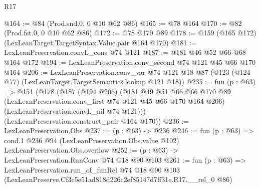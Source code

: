 \begin{lexlean}{R17}
\begin{coremodule}
@164 := @84 (Prod.snd.{0, 0} @10 @62 @86)
@165 := @78 @164
@170 := @82 (Prod.fst.{0, 0} @10 @62 @86)
@172 := @78 @170 @89
@178 := @159 (@165 @172) (LexLeanTarget.TargetSyntax.Value.pair @164 @170)
@181 := LexLeanPreservation.convL_cons @74 @121
@187 := @181 @46 @52 @66 @68 @164 @172
@194 := LexLeanPreservation.conv_second @74 @121 @45 @66 @170 @164
@206 := LexLeanPreservation.conv_var
    @74
    @121
    @18
    @87
    (@123 (@124 @77) (LexLeanTarget.TargetSemantics.lookup @121 @18))
@235 := fun (p : @63) =>
  @151
    (@178
      (@187
        (@194 @206)
        (@181
          @49
          @51
          @66
          @66
          @170
          @89
          (LexLeanPreservation.conv_first @74 @121 @45 @66 @170 @164 @206)
          (LexLeanPreservation.convL_nil @74 @121)))
      (LexLeanPreservation.construct_pair @164 @170))
@236 := LexLeanPreservation.Obs
@237 := (p : @63) -> @236
@246 := fun (p : @63) =>
  cond.{1} @236 @94 (LexLeanPreservation.Obs.value @102) LexLeanPreservation.Obs.overflow
@252 := (p : @63) -> LexLeanPreservation.RunConv @74 @18 @90 @103
@261 := fun (p : @63) =>
  LexLeanPreservation.run_of_funRel
    @74
    @18
    @90
    @103
    (LexLeanPreserve.Cf3c5e51ad818d226c2ef85147d7ff31e.R17.__rel_0 @86)
\end{coremodule}
\end{lexlean}
